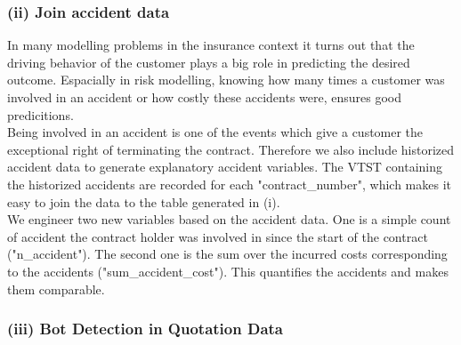 \documentclass[12pt,titlepage]{article}
\begin{document}
\subsubsection*{(ii) Join accident data}
In many modelling problems in the insurance context it turns out that the driving behavior of the customer plays a big role in predicting the desired outcome. Espacially in risk modelling, knowing how many times a customer was involved in an accident or how costly these accidents were, ensures good predicitions. \\
Being involved in an accident is one of the events which give a customer the exceptional right of terminating the contract. Therefore we also include historized accident data to generate explanatory accident variables. The VTST containing the historized accidents are recorded for each "contract\_number", which makes it easy to join the data to the table generated in (i). \\
We engineer two new variables based on the accident data. One is a simple count of accident the contract holder was involved in since the start of the contract ("n\_accident"). The second one is the sum over the incurred costs corresponding to the accidents ("sum\_accident\_cost"). This quantifies the accidents and makes them comparable. \\


\subsubsection*{(iii) Bot Detection in Quotation Data}
\end{document}
